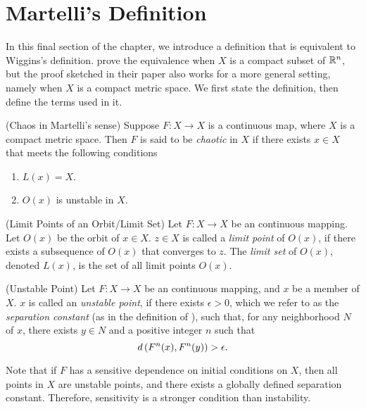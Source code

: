 \documentclass[10pt,draft,twoside]{book}
\begin{document}
\section{Martelli's Definition}
In this final section of the chapter, we introduce a definition that is equivalent to Wiggins's definition.
\citet{martelli} prove the equivalence when $X$ is a compact subset of $\mathbb{R}^n$, but the proof sketched in their paper also works for a more general setting, namely when $X$ is a compact metric space.
We first state the definition, then define the terms used in it.
\begin{definition}
  (Chaos in Martelli's sense)
  Suppose $F: X \to X$ is a continuous map, where $X$ is a compact metric space.
  Then $F$ is said to be \textit{chaotic} in $X$ if there exists $x \in X$ that meets the following conditions
  \begin{enumerate}
    \item $L(x) = X$.
    \item $O(x)$ is unstable in $X$.
  \end{enumerate}
  \label{defn:martelli}
\end{definition}
\begin{definition}
  (Limit Points of an Orbit/Limit Set)
  Let $F: X\to X$ be an continuous mapping.
  Let $O(x)$ be the orbit of $x \in X$.
  $z \in X$ is called a \textit{limit point} of $O(x)$, if there exists a subsequence of $O(x)$ that converges to $z$.
  The \textit{limit set} of $O(x)$, denoted $L(x)$, is the set of all limit points $O(x)$.
  \label{def:limset}
\end{definition}
\begin{definition}
  (Unstable Point)
  Let $F: X\to X$ be an continuous mapping, and $x$ be a member of $X$.
  $x$ is called an \textit{unstable point}, if there exists $\epsilon > 0$, which we refer to as the \textit{separation constant} (as in the definition of \sdic), such that, for any neighborhood $N$ of $x$, there exists $y \in N$ and a positive integer $n$ such that 
  \begin{equation*}
    d\left( F^{n}(x), F^{n}(y) \right) > \epsilon.
  \end{equation*}
  \label{defn:unstable-orbit}
\end{definition}
Note that if $F$ has a sensitive dependence on initial conditions on $X$, then all points in $X$ are unstable points, and there exists a globally defined separation constant.
Therefore, sensitivity is a stronger condition than instability.
\end{document}
